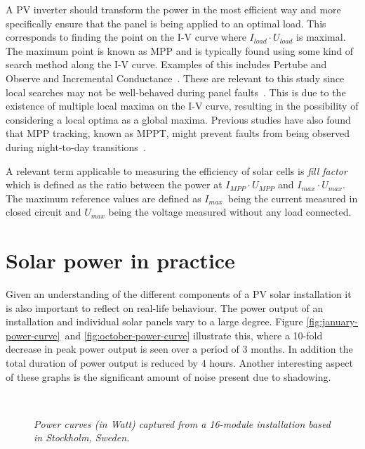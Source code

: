 A PV inverter should transform the power in the most efficient way and more specifically ensure that the panel is being applied to an optimal load.
This corresponds to finding the point on the I-V curve where $I_{load} \cdot U_{load}$ is maximal.
The maximum point is known as MPP and is typically found using some kind of search method along the I-V curve.
Examples of this includes Pertube and Observe and Incremental Conductance~\cite{Roman2006}.
These are relevant to this study since local searches may not be well-behaved during panel faults~\cite{Roman2006}.
This is due to the existence of multiple local maxima on the I-V curve, resulting in the possibility of considering a local optima as a global maxima.
Previous studies have also found that MPP tracking, known as MPPT, might prevent faults from being observed during night-to-day transitions~\cite{Zhao2010night}.

A relevant term applicable to measuring the efficiency of solar cells is \emph{fill factor} which is defined as the ratio between the power at $I_{MPP} \cdot U_{MPP}$ and $I_{max} \cdot U_{max}$.
The maximum reference values are defined as $I_{max}$ being the current measured in closed circuit and $U_{max}$ being the voltage measured without any load connected.


\section{Solar power in practice}
Given an understanding of the different components of a PV solar installation it is also important to reflect on real-life behaviour.
The power output of an installation and individual solar panels vary to a large degree.
Figure \ref{fig:january-power-curve} and \ref{fig:october-power-curve} illustrate this, where a 10-fold decrease in peak power output is seen over a period of 3 months.
In addition the total duration of power output is reduced by 4 hours.
Another interesting aspect of these graphs is the significant amount of noise present due to shadowing.

\begin{figure}[here]
\centering
{}
~
\caption[Power curves captured from an installation]{\emph{Power curves (in Watt) captured from a 16-module installation based in Stockholm, Sweden.}}
\end{figure}

